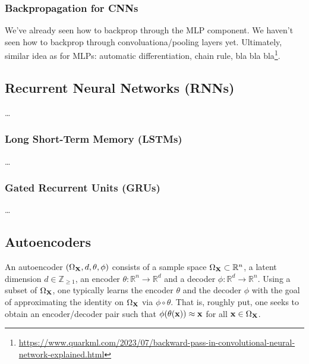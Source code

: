 \documentclass[11pt]{article}
\begin{document}
\subsubsection{Backpropagation for CNNs}
We've already seen how to backprop through the MLP component. We haven't seen how to backprop through convoluationa/pooling layers yet. Ultimately, similar idea as for MLPs: automatic differentiation, chain rule, bla bla bla\footnote{\url{https://www.quarkml.com/2023/07/backward-pass-in-convolutional-neural-network-explained.html}}.

\subsection{Recurrent Neural Networks (RNNs)}
\dots

\subsubsection{Long Short-Term Memory (LSTMs)}
\dots

\subsubsection{Gated Recurrent Units (GRUs)}
\dots

\subsection{Autoencoders}
\label{sec:autoencoders}
An autoencoder $(\Omega_{\mathbf{X}},d,\theta,\phi)$ consists of a sample space $\Omega_{\mathbf{X}}\subset\mathbb{R}^n$, a latent dimension $d\in\mathbb{Z}_{\geq1}$, an encoder $\theta:\mathbb{R}^n\to\mathbb{R}^d$ and a decoder $\phi:\mathbb{R}^d\to\mathbb{R}^n$. Using a subset of $\Omega_{\mathbf{X}}$, one typically learns the encoder $\theta$ and the decoder $\phi$ with the goal of approximating the identity on $\Omega_{\mathbf{X}}$ via $\phi\circ \theta$. That is, roughly put, one seeks to obtain an encoder/decoder pair such that $\phi(\theta(\mathbf{x}))\approx\mathbf{x}$ for all $\mathbf{x}\in\Omega_{\mathbf{X}}$.
\end{document}
